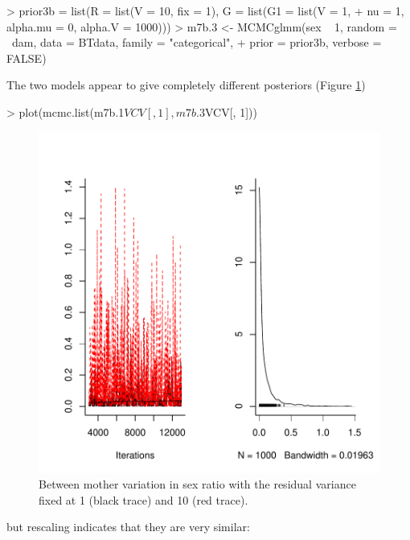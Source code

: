 \documentclass{article}
\begin{document}
\begin{Schunk}
\begin{Sinput}
> prior3b = list(R = list(V = 10, fix = 1), G = list(G1 = list(V = 1, 
+     nu = 1, alpha.mu = 0, alpha.V = 1000)))
> m7b.3 <- MCMCglmm(sex ~ 1, random = ~dam, data = BTdata, family = "categorical", 
+     prior = prior3b, verbose = FALSE)
\end{Sinput}
\end{Schunk}

The two models appear to give completely different posteriors (Figure \ref{sexratio2})

\begin{Schunk}
\begin{Sinput}
> plot(mcmc.list(m7b.1$VCV[, 1], m7b.3$VCV[, 1]))
\end{Sinput}
\end{Schunk}

\begin{figure}[!h]
\begin{center}
\includegraphics{Lecture8-020}
\end{center}
\caption{Between mother variation in sex ratio with the residual variance fixed at 1 (black trace) and 10 (red trace).}
\label{sexratio2}
\end{figure}

but rescaling indicates that they are very similar: 
\end{document}
